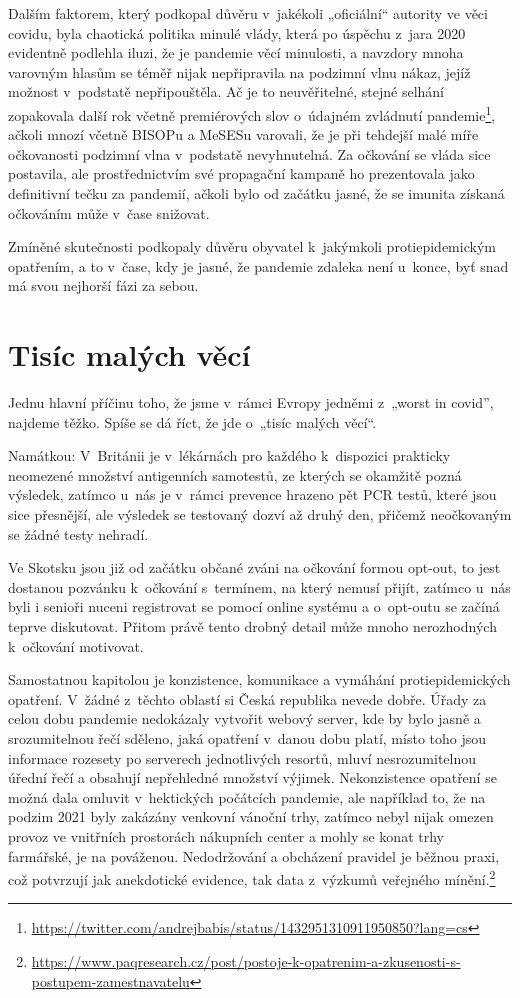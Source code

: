 Dalším faktorem, který podkopal důvěru v~jakékoli „oficiální“ autority ve věci covidu, byla chaotická politika minulé vlády, která po úspěchu z~jara 2020 evidentně podlehla iluzi, že je pandemie věcí minulosti, a navzdory mnoha varovným hlasům se téměř nijak nepřipravila na podzimní vlnu nákaz, jejíž možnost v~podstatě nepřipouštěla. Ač je to neuvěřitelné, stejné selhání zopakovala další rok včetně premiérových slov o~údajném zvládnutí pandemie\footnote{\url{https://twitter.com/andrejbabis/status/1432951310911950850?lang=cs}}, ačkoli mnozí včetně BISOPu a MeSESu varovali, že je při tehdejší malé míře očkovanosti podzimní vlna v~podstatě nevyhnutelná. Za očkování se vláda sice postavila, ale prostřednictvím své propagační kampaně ho prezentovala jako definitivní tečku za pandemií, ačkoli bylo od začátku jasné, že se imunita získaná očkováním může v~čase snižovat. 

Zmíněné skutečnosti podkopaly důvěru obyvatel k~jakýmkoli protiepidemickým opatřením, a to v~čase, kdy je jasné, že pandemie zdaleka není u~konce, byť snad má svou nejhorší fázi za sebou.

\section*{Tisíc malých věcí}

Jednu hlavní příčinu toho, že jsme v~rámci Evropy jedněmi z~„worst in
covid”, najdeme těžko. Spíše se dá říct, že jde o~„tisíc malých věcí“.

Namátkou: V~Británii je v~lékárnách pro každého k~dispozici prakticky neomezené množství antigenních samotestů, ze kterých se okamžitě pozná výsledek, zatímco u~nás je v~rámci prevence hrazeno pět PCR testů, které jsou sice přesnější, ale výsledek se testovaný dozví až druhý den, přičemž neočkovaným se žádné testy nehradí. 

Ve Skotsku jsou již od začátku občané zváni na očkování formou opt-out, to jest dostanou pozvánku k~očkování s~termínem, na který nemusí přijít, zatímco u~nás byli i senioři nuceni registrovat se pomocí online systému a o~opt-outu se začíná teprve diskutovat. Přitom právě tento drobný detail může mnoho nerozhodných k~očkování motivovat.

Samostatnou kapitolou je konzistence, komunikace a vymáhání protiepidemických opatření. V~žádné z~těchto oblastí si Česká republika nevede dobře. Úřady za celou dobu pandemie nedokázaly vytvořit webový server, kde by bylo jasně a srozumitelnou řečí sděleno, jaká opatření v~danou dobu platí, místo toho jsou informace rozesety po serverech jednotlivých resortů, mluví nesrozumitelnou úřední řečí a obsahují nepřehledné množství výjimek. Nekonzistence opatření se možná dala omluvit v~hektických počátcích pandemie, ale například to, že na podzim 2021 byly zakázány venkovní vánoční trhy, zatímco nebyl nijak omezen provoz ve vnitřních prostorách nákupních center a mohly se konat trhy farmářské, je na pováženou. Nedodržování a obcházení pravidel je běžnou praxi, což potvrzují jak anekdotické evidence, tak data z~výzkumů veřejného mínění.\footnote{\url{https://www.paqresearch.cz/post/postoje-k-opatrenim-a-zkusenosti-s-postupem-zamestnavatelu}}

